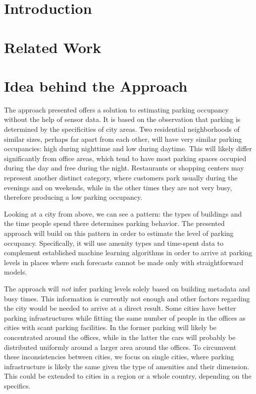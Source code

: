 \documentclass{ws-ijait}
\begin{document}
	\section{Introduction}
	
	\section{Related Work}

	\section{Idea behind the Approach}
	The approach presented offers a solution to estimating parking occupancy without the help of sensor data. It is based on the observation that parking is determined by the specificities of city areas. Two residential neighborhoods of similar sizes, perhaps far apart from each other, will have very similar parking occupancies: high during nighttime and low during daytime. This will likely differ significantly from office areas, which tend to have most parking spaces occupied during the day and free during the night. Restaurants or shopping centers may represent another distinct category, where customers park usually during the evenings and on weekends, while in the other times they are not very busy, therefore producing a low parking occupancy.
	
	Looking at a city from above, we can see a pattern: the types of buildings and the time people spend there determines parking behavior. The presented approach will build on this pattern in order to estimate the level of parking occupancy. Specifically, it will use amenity types and time-spent data to complement established machine learning algorithms in order to arrive at parking levels in places where such forecasts cannot be made only with straightforward models.
	
	The approach will \textit{not} infer parking levels solely based on building metadata and busy times. This information is currently not enough and other factors regarding the city would be needed to arrive at a direct result. Some cities have better parking infrastructures while fitting the same number of people in the offices as cities with scant parking facilities. In the former parking will likely be concentrated around the offices, while in the latter the cars will probably be distributed uniformly around a larger area around the offices. To circumvent these inconsistencies between cities, we focus on single cities, where parking infrastructure is likely the same given the type of amenities and their dimension. This could be extended to cities in a region or a whole country, depending on the specifics.
	
\end{document}
